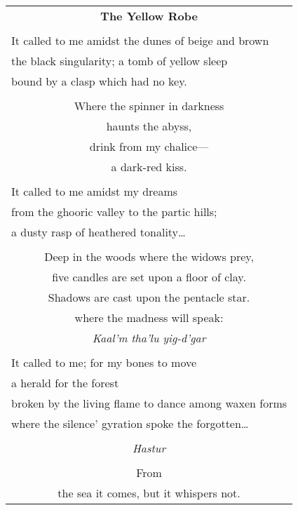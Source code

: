 \documentclass{article}
\begin{document}
\newcommand{\h}{\hspace*{4ex}}

\begin{center}
\begin{tabular}{l}
\multicolumn{1}{c}{\large\textbf{The Yellow Robe}} \\
\\
It called to me amidst the dunes of beige and brown \\
the black singularity; a tomb of yellow sleep \\
bound by a clasp which had no key. \\
\\
\multicolumn{1}{c}{Where the spinner in darkness} \\
\multicolumn{1}{c}{haunts the abyss,} \\
\multicolumn{1}{c}{drink from my chalice---} \\
\multicolumn{1}{c}{a dark-red kiss.} \\
\\
It called to me amidst my dreams \\
from the ghooric valley to the partic hills; \\
a dusty rasp of heathered tonality\ldots{} \\
\\
\multicolumn{1}{c}{Deep in the woods where the widows prey,} \\
\multicolumn{1}{c}{five candles are set upon a floor of clay.} \\
\multicolumn{1}{c}{Shadows are cast upon the pentacle star.} \\
\multicolumn{1}{c}{where the madness will speak:} \\
\multicolumn{1}{c}{
	\textit{Kaal'm tha'lu yig-d'gar} %
} \\
\\
It called to me; for my bones to move \\
a herald for the forest \\
broken by the living flame to dance among waxen forms \\
where the silence' gyration spoke the forgotten\ldots{} \\
\\
\multicolumn{1}{c}{\textit{Hastur}} \\
\\
\multicolumn{1}{c}{From} \\
\multicolumn{1}{c}{the sea it comes, but it whispers not.} \\

\end{tabular}
\end{center}
\end{document}
